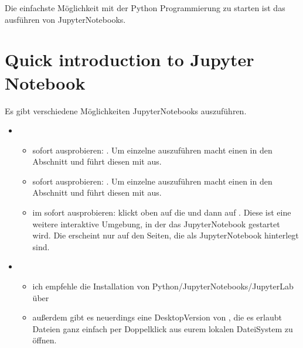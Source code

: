 \documentclass[letterpaper,10pt,english]{jupyterBook}
\begin{document}
\sphinxAtStartPar
Die einfachste Möglichkeit mit der Python Programmierung zu starten ist das ausführen von Jupyter\sphinxhyphen{}Notebooks.


\section{Quick introduction to Jupyter Notebook}
\label{\detokenize{content/00_jupyter:quick-introduction-to-jupyter-notebook}}
\sphinxAtStartPar
Es gibt verschiedene Möglichkeiten Jupyter\sphinxhyphen{}Notebooks auszuführen.
\begin{itemize}
\item {} 
\sphinxAtStartPar
{}
\begin{itemize}
\item {} 
\sphinxAtStartPar
{} sofort ausprobieren: . Um einzelne  auszuführen macht einen  in den Abschnitt und führt diesen mit  aus.

\item {} 
\sphinxAtStartPar
{} sofort ausprobieren: . Um einzelne  auszuführen macht einen  in den Abschnitt und führt diesen mit  aus.

\item {} 
\sphinxAtStartPar
{} im  sofort ausprobieren: klickt oben auf die  und dann auf . Diese ist eine weitere interaktive Umgebung, in der das Jupyter\sphinxhyphen{}Notebook gestartet wird. Die  erscheint nur auf den Seiten, die als Jupyter\sphinxhyphen{}Notebook hinterlegt sind.

\end{itemize}

\item {} 
\sphinxAtStartPar
{}
\begin{itemize}
\item {} 
\sphinxAtStartPar
ich empfehle die Installation von Python/Jupyter\sphinxhyphen{}Notebooks/Jupyter\sphinxhyphen{}Lab über 

\item {} 
\sphinxAtStartPar
außerdem gibt es neuerdings eine Desktop\sphinxhyphen{}Version von , die es erlaubt  Dateien ganz einfach per Doppelklick aus eurem lokalen Datei\sphinxhyphen{}System zu öffnen.

\end{itemize}

\end{itemize}
\end{document}
